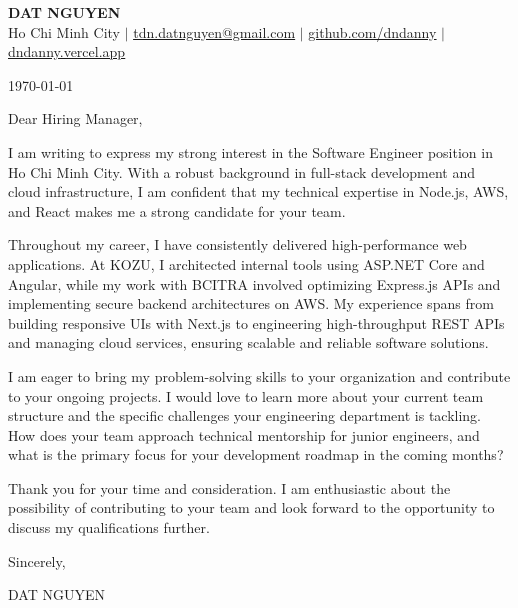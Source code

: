 \documentclass[letterpaper,11pt]{article}
\begin{document}
\begin{center}
\textbf{\Huge \scshape DAT NGUYEN} \\ \vspace{1pt}
\small Ho Chi Minh City $|$ \href{mailto:tdn.datnguyen@gmail.com}{\underline{tdn.datnguyen@gmail.com}} $|$
\href{https://github.com/dndanny}{\underline{github.com/dndanny}} $|$
\href{https://dndanny.vercel.app}{\underline{dndanny.vercel.app}}
\end{center}

\today

\vspace{20pt}

Dear Hiring Manager,

I am writing to express my strong interest in the Software Engineer position in Ho Chi Minh City. With a robust background in full-stack development and cloud infrastructure, I am confident that my technical expertise in Node.js, AWS, and React makes me a strong candidate for your team.

Throughout my career, I have consistently delivered high-performance web applications. At KOZU, I architected internal tools using ASP.NET Core and Angular, while my work with BCITRA involved optimizing Express.js APIs and implementing secure backend architectures on AWS. My experience spans from building responsive UIs with Next.js to engineering high-throughput REST APIs and managing cloud services, ensuring scalable and reliable software solutions.

I am eager to bring my problem-solving skills to your organization and contribute to your ongoing projects. I would love to learn more about your current team structure and the specific challenges your engineering department is tackling. How does your team approach technical mentorship for junior engineers, and what is the primary focus for your development roadmap in the coming months?

Thank you for your time and consideration. I am enthusiastic about the possibility of contributing to your team and look forward to the opportunity to discuss my qualifications further.

Sincerely,

\vspace{30pt}

DAT NGUYEN
\end{document}
